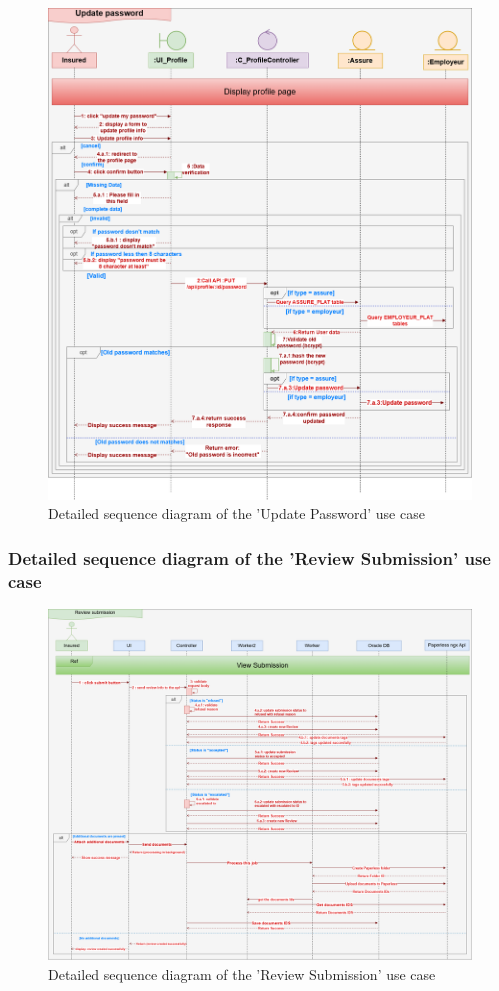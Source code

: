 \begin{figure}[h!]
    \centering
    \includegraphics[width=1\textwidth]{figures/det update password.png}
    \caption{Detailed sequence diagram of the 'Update Password' use case}
\end{figure}
\clearpage
\subsubsection{Detailed sequence diagram of the 'Review Submission' use case}
\begin{figure}[h!]
    \centering
    \includegraphics[width=1\textwidth]{figures/det review submission.png}
    \caption{Detailed sequence diagram of the 'Review Submission' use case}
\end{figure}
\clearpage
